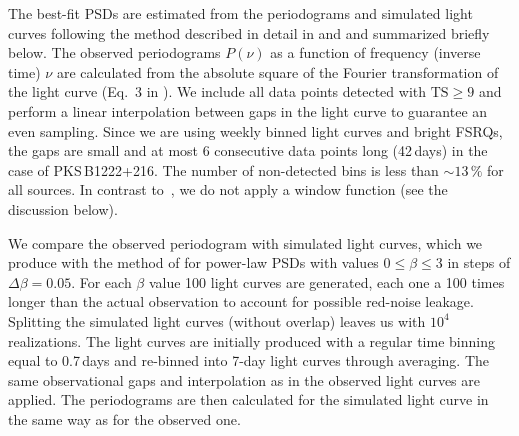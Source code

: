 \documentclass[twocolumn,linenumbers]{aastex62}
\begin{document}
The best-fit PSDs are estimated from the periodograms and simulated light curves following the method described in detail in \citet{2014MNRAS.445..437M} and \citet{2013MNRAS.433..907E} and summarized briefly below.
The observed periodograms $P(\nu)$ as a function of frequency (inverse time) $\nu$ are calculated from the absolute square of the Fourier transformation of the light curve (Eq.~3 in \citealt{2014MNRAS.445..437M}). 
We include all data points detected with $\mathrm{TS} \geqslant 9$ and perform a linear interpolation between gaps in the light curve to guarantee an even sampling. 
Since we are using weekly binned light curves and bright FSRQs, the gaps are small and at most 6 consecutive data points long (42\,days) in the case of PKS\,B1222+216. The number of non-detected bins is less than $\sim13\,\%$ for all sources.
In contrast to~\citet{2014MNRAS.445..437M}, we do not apply a window function (see the discussion below). 

We compare the observed periodogram with simulated light curves, which we produce with the method of \citet{1995A&A...300..707T} for power-law PSDs with values $0 \leqslant \beta \leqslant 3$ in steps of $\Delta\beta = 0.05$. For each $\beta$ value 100 light curves are generated, each one a 100 times longer than the actual observation to account for possible red-noise leakage. Splitting the simulated light curves (without overlap) leaves us with $10^4$ realizations. 
The light curves are initially produced with a regular time binning equal to 0.7\,days and  re-binned into 7-day light curves through averaging. 
The same observational gaps and interpolation as in the observed light curves are applied. 
The periodograms are then calculated for the simulated light curve in the same way as for the observed one.
\end{document}
